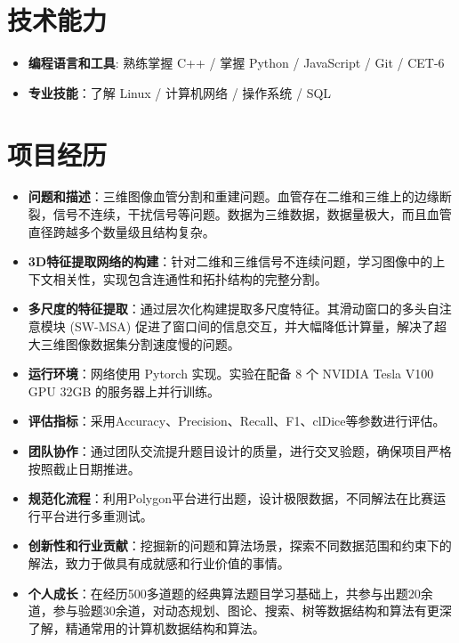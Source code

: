 \documentclass{resume}
\begin{document}
\section{技术能力}
\begin{itemize}[parsep=0.2ex]
	\item \textbf{编程语言和工具}: 熟练掌握 C++ / 掌握 Python / JavaScript / Git / CET-6
	\item \textbf{专业技能}：了解 Linux / 计算机网络 / 操作系统 / SQL
\end{itemize}


\section{项目经历}
\begin{itemize}
	\item \textbf{问题和描述}：三维图像血管分割和重建问题。血管存在二维和三维上的边缘断裂，信号不连续，干扰信号等问题。数据为三维数据，数据量极大，而且血管直径跨越多个数量级且结构复杂。
	\item \textbf{3D特征提取网络的构建}：针对二维和三维信号不连续问题，学习图像中的上下文相关性，实现包含连通性和拓扑结构的完整分割。
	\item \textbf{多尺度的特征提取}：通过层次化构建提取多尺度特征。其滑动窗口的多头自注意模块 (SW-MSA) 促进了窗口间的信息交互，并大幅降低计算量，解决了超大三维图像数据集分割速度慢的问题。
	\item \textbf{运行环境}：网络使用 Pytorch 实现。实验在配备 8 个 NVIDIA Tesla V100 GPU 32GB 的服务器上并行训练。
	\item \textbf{评估指标}：采用Accuracy、Precision、Recall、F1、clDice等参数进行评估。
\end{itemize}

\begin{itemize}
	\item \textbf{团队协作}：通过团队交流提升题目设计的质量，进行交叉验题，确保项目严格按照截止日期推进。
	\item \textbf{规范化流程}：利用Polygon平台进行出题，设计极限数据，不同解法在比赛运行平台进行多重测试。
	\item \textbf{创新性和行业贡献}：挖掘新的问题和算法场景，探索不同数据范围和约束下的解法，致力于做具有成就感和行业价值的事情。
	\item \textbf{个人成长}：在经历500多道题的经典算法题目学习基础上，共参与出题20余道，参与验题30余道，对动态规划、图论、搜索、树等数据结构和算法有更深了解，精通常用的计算机数据结构和算法。
\end{itemize}
\end{document}
